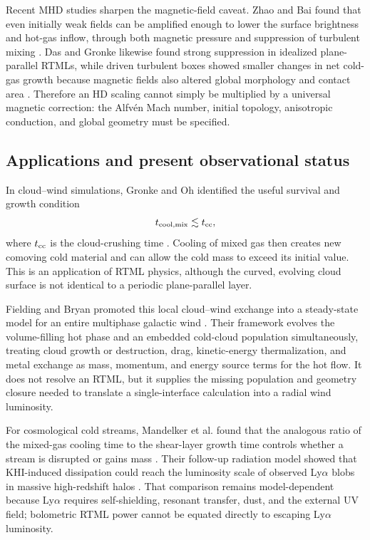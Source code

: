 \documentclass[english,a4paper]{my_memo2}
\begin{document}
Recent MHD studies sharpen the magnetic-field caveat.  Zhao and Bai found that
even initially weak fields can be amplified enough to lower the surface
brightness and hot-gas inflow, through both magnetic pressure and suppression
of turbulent mixing \cite{ZhaoBai2023}.  Das and Gronke likewise found strong
suppression in idealized plane-parallel RTMLs, while driven turbulent boxes
showed smaller changes in net cold-gas growth because magnetic fields also
altered global morphology and contact area \cite{DasGronke2024}.  Therefore an
HD scaling cannot simply be multiplied by a universal magnetic correction:
the Alfv\'en Mach number, initial topology, anisotropic conduction, and global
geometry must be specified.

\subsection{Applications and present observational status}

In cloud--wind simulations, Gronke and Oh identified the useful survival and
growth condition
\begin{equation}
 t_{\rm cool,mix}\lesssim t_{\rm cc},
\end{equation}
where $t_{\rm cc}$ is the cloud-crushing time \cite{GronkeOh2018}.  Cooling of
mixed gas then creates new comoving cold material and can allow the cold mass
to exceed its initial value.  This is an application of RTML physics, although
the curved, evolving cloud surface is not identical to a periodic
plane-parallel layer.

Fielding and Bryan promoted this local cloud--wind exchange into a
steady-state model for an entire multiphase galactic wind
\cite{FieldingBryan2022}.  Their framework evolves the volume-filling hot
phase and an embedded cold-cloud population simultaneously, treating
cloud growth or destruction, drag, kinetic-energy thermalization, and metal
exchange as mass, momentum, and energy source terms for the hot flow.  It
does not resolve an RTML, but it supplies the missing population and geometry
closure needed to translate a single-interface calculation into a radial
wind luminosity.

For cosmological cold streams, Mandelker et al. found that the analogous ratio
of the mixed-gas cooling time to the shear-layer growth time controls whether a
stream is disrupted or gains mass \cite{Mandelker2020}.  Their follow-up
radiation model showed that KHI-induced dissipation could reach the luminosity
scale of observed Ly$\alpha$ blobs in massive high-redshift halos
\cite{MandelkerLya2020}.  That comparison remains model-dependent because
Ly$\alpha$ requires self-shielding, resonant transfer, dust, and the external
UV field; bolometric RTML power cannot be equated directly to escaping
Ly$\alpha$ luminosity.
\end{document}
